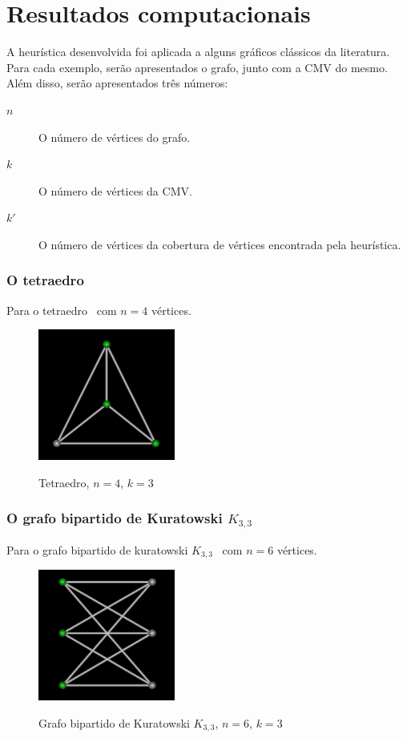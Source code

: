 \part{Resultados computacionais}
\label{sec:resultados}

A heurística desenvolvida foi aplicada a alguns gráficos clássicos da
literatura. Para cada exemplo, serão apresentados o grafo, junto com a
CMV do mesmo. Além disso, serão apresentados três números:
\begin{description}
    \item[$n$] O número de vértices do grafo.
    \item[$k$] O número de vértices da CMV.
    \item[$k'$] O número de vértices da cobertura de vértices
    encontrada pela heurística.
\end{description}

\section{O tetraedro}
Para o tetraedro~\cite{cite:example-plato} com $n=4$ vértices.

\begin{figure}[htb]
\centering
\includegraphics[width=0.4\textwidth]{img/tetraedro.png}
\label{fig:example-tetraedro}
\caption{Tetraedro, $n=4$, $k=3$}
\end{figure}

\section{O grafo bipartido de Kuratowski $K_{3,3}$}
Para o grafo bipartido de kuratowski
$K_{3,3}$~\cite{cite:example-kuratowski} com $n=6$ vértices.

\begin{figure}[htb]
\centering
\includegraphics[width=0.4\textwidth]{img/kuratowski.png}
\label{fig:example-kuratowski}
\caption{Grafo bipartido de Kuratowski $K_{3,3}$, $n=6$, $k=3$}
\end{figure}


